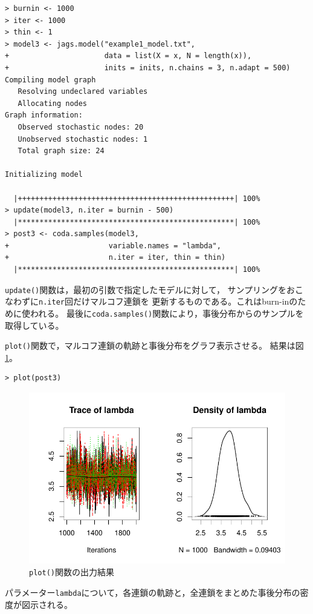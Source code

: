 \documentclass[11pt,uplatex]{jsarticle}
\begin{document}
\begin{lstlisting}
> burnin <- 1000
> iter <- 1000
> thin <- 1
> model3 <- jags.model("example1_model.txt",
+                      data = list(X = x, N = length(x)),
+                      inits = inits, n.chains = 3, n.adapt = 500)
Compiling model graph
   Resolving undeclared variables
   Allocating nodes
Graph information:
   Observed stochastic nodes: 20
   Unobserved stochastic nodes: 1
   Total graph size: 24

Initializing model

  |++++++++++++++++++++++++++++++++++++++++++++++++++| 100%
> update(model3, n.iter = burnin - 500)
  |**************************************************| 100%
> post3 <- coda.samples(model3,
+                       variable.names = "lambda",
+                       n.iter = iter, thin = thin)
  |**************************************************| 100%
\end{lstlisting}
%
\texttt{update()}関数は，最初の引数で指定したモデルに対して，
サンプリングをおこなわずに\texttt{n.iter}回だけマルコフ連鎖を
更新するものである。これはburn-inのために使われる。
最後に\texttt{coda.samples()}関数により，事後分布からのサンプルを取得している。

\texttt{plot()}関数で，マルコフ連鎖の軌跡と事後分布をグラフ表示させる。
結果は図\ref{fig:plot}。
\begin{lstlisting}
> plot(post3)
\end{lstlisting}

\begin{figure}[htbp]
  \begin{center}
    \includegraphics[bb=0 0 360 240, clip, width=260 bp]{example1-3.pdf}
  \end{center}
  \caption{\texttt{plot()}関数の出力結果}
  \label{fig:plot}
\end{figure}\noindent
パラメーター\texttt{lambda}について，各連鎖の軌跡と，全連鎖をまとめた事後分布の密度が図示される。
\end{document}
